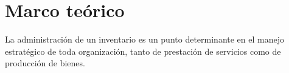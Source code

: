 

\chapter{Marco teórico}
La administración de un inventario es un punto determinante en el manejo estratégico de toda organización, tanto de prestación de servicios como de producción de bienes.\\
